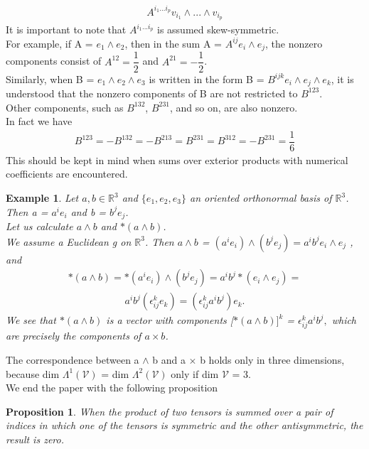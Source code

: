 \documentclass[12pt,a4paper]{article}
\newtheorem{exmp}{Example}[section]
\newtheorem{prop}{Proposition}
\begin{document}
\begin{align*}
A^{i_1 ... i_p} v_{i_1} \wedge ... \wedge v_{i_p}
\end{align*}
It is important to note that $A^{i_1 ... i_p}$ is assumed skew-symmetric. \\For example,
if A = $e_1 \wedge e_2$, then in the sum A = $A^{ij} e_i \wedge e_j$, the nonzero components consist of $A^{12} = \dfrac{1}{2}$ and $A^{21} = -\dfrac{1}{2}$. \\Similarly, when B = $e_1 \wedge e_2 \wedge e_3$ is written in the form B = $B^{ijk} e_i \wedge e_j \wedge e_k$, it is understood that the nonzero components of B are not restricted to  $B^{123}$. \\Other components, such as $B^{132}$, $B^{231}$, and so on, are also nonzero.\\ In fact we have\\
\begin{align*}
B^{123} = -B^{132} = -B^{213} = B^{231} = B^{312} = -B^{231} = \dfrac{1}{6}
\end{align*}
This should be kept in mind when sums over exterior products with numerical coefficients are encountered.
\begin{exmp}
Let $a, b $$\in \mathbb{R}^3$ and $\{e_1, e_2, e_3\}$ an oriented orthonormal basis of $\mathbb{R}^3$. Then a = $a^i e_i$ and b = $b^j e_j$.\\
Let us calculate  $a \wedge b$ and $\ast(a \wedge b)$.\\
We assume a Euclidean g on $\mathbb{R}^3$. Then $a \wedge b$ = $( a^i e_i) \wedge (b^j e_j) = a^i b^j e_i \wedge e_j$ , and
\begin{align*}
\ast (a \wedge b) = \ast (a ^ i e_i) \wedge (b^j e_j) = a^i b^j \ast (e_i \wedge e_j)=
\end{align*}
\begin{align*}
 a^i b^j ( \epsilon^k_{ij} e_k) = (\epsilon^k_{ij} a^i b^j) e_k.
\end{align*}
We see that $\ast (a \wedge b)$ is a vector with components [$\ast(a \wedge b)]^k$ = $\epsilon^k_{ij} a^i b^j,$ which are precisely the components of $a \times b$.
\end{exmp}
The correspondence between a $\wedge$ b and a $\times$ b holds only in three dimensions, because dim $\Lambda^{1}(\mathcal{V})$ = dim $\Lambda^{2}(\mathcal{V})$ only if dim $\mathcal{V}$ = 3.
\\We end the paper with the following proposition
\begin{prop}
When the product of two tensors is summed over a pair of indices in which one of the tensors is symmetric and the other antisymmetric, the result is zero.
\end{prop}
\end{document}
